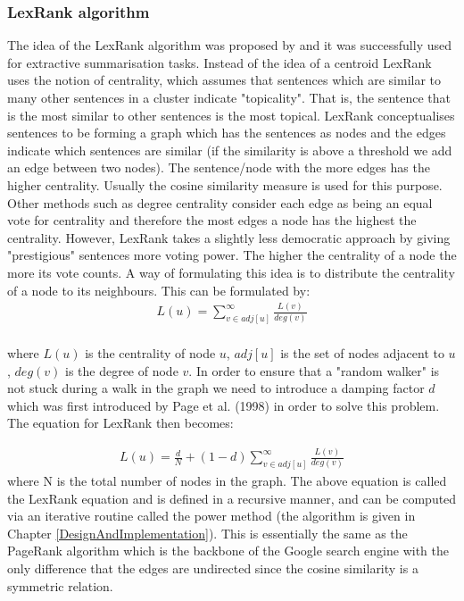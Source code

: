 \subsubsection{LexRank algorithm}
The idea of the LexRank algorithm was proposed by \citep{Erkan:2004:LGL:1622487.1622501} and it was successfully used for extractive summarisation tasks. Instead of the idea of a centroid LexRank uses the notion of centrality, which assumes that sentences which are similar to many other sentences in a cluster indicate "topicality". That is, the
sentence that is the most similar to other sentences is the most topical. LexRank conceptualises sentences to be forming a graph which has the sentences as nodes and the edges indicate which sentences are similar (if the similarity is above a threshold we add an edge between two nodes). The sentence/node with the more edges has the higher centrality. Usually the cosine similarity measure is used for this purpose. Other methods such as degree centrality consider each edge as being an equal vote for centrality and therefore the most edges a node has the highest the centrality. However, LexRank takes a slightly less democratic approach by giving "prestigious" sentences more voting power. The higher the centrality of a node the more its vote counts. A way of formulating this idea is to distribute the centrality of a node to its neighbours. This can be formulated by:
\begin{eqnarray}
L(u) = \sum_{v \in adj[u]}^{\infty}\frac{L(v)}{deg(v)}
\end{eqnarray} \\
where $L(u)$ is the centrality of node $u$, $adj[u]$ is the set of nodes adjacent to $u$, $deg(v)$ is the degree of node $v$.
In order to ensure that a "random walker" is not stuck during a walk in the graph we need to introduce a damping factor $d$ which was first introduced by Page et al. (1998) in order to solve this problem. The equation for LexRank then becomes:

\begin{eqnarray}\label{LexRankEquation}
L(u) = \frac{d}{N} + (1-d) \sum_{v \in adj[u]}^{\infty}\frac{L(v)}{deg(v)}
\end{eqnarray} 
where N is the total number of nodes in the graph. The above equation is called the LexRank equation and is defined in a recursive manner, and can be computed via an iterative routine called the power method (the algorithm is given in Chapter \ref{DesignAndImplementation}). This is essentially the same as the PageRank algorithm which is the backbone of the Google search engine with the only difference that the edges are undirected since the cosine similarity is a symmetric relation.

